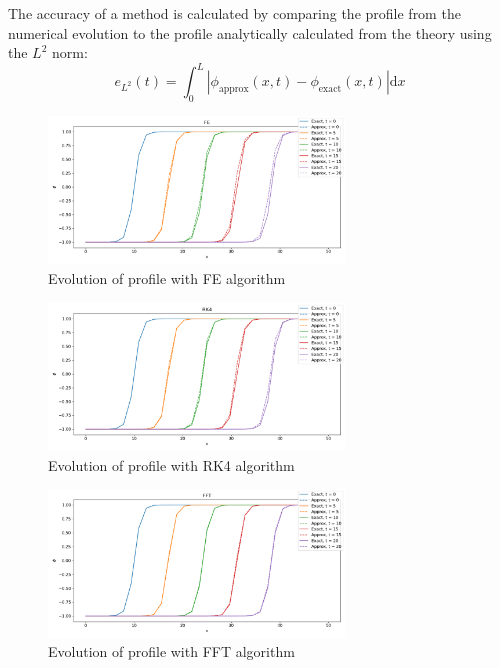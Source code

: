 \documentclass[12pt]{article}
\newcommand{\diff}{\mathrm{d}}
\begin{document}
The accuracy of a method is calculated by comparing the profile from the numerical evolution to the profile analytically calculated from the theory using the $L^2$ norm:
\begin{equation}
    e_{L^2} (t) = \int_{0}^{L} |\phi_{\text{approx}}(x,t) - \phi_{\text{exact}}(x,t)| \diff x 
    \label{eq:L2_norm}
\end{equation}
\begin{figure}
    \centering
    \includegraphics[width=0.7\textwidth]{../figures/FEprof_evo.png}
    \caption{Evolution of profile with FE algorithm}
    \label{fig:FE_prof}
\end{figure}
\begin{figure}
    \centering
    \includegraphics[width=0.7\textwidth]{../figures/RK4prof_evo.png}
    \caption{Evolution of profile with RK4 algorithm}
    \label{fig:RK4_prof}
\end{figure}
\begin{figure}
    \centering
    \includegraphics[width=0.7\textwidth]{../figures/FFTprof_evo.png}
    \caption{Evolution of profile with FFT algorithm}
    \label{fig:FFT_prof}
\end{figure}
\end{document}
